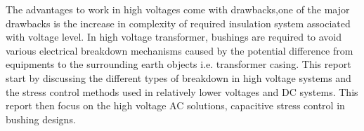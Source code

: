 The advantages to work in high voltages come with drawbacks,one of the major drawbacks is the increase in complexity of required insulation system associated with voltage level. In high voltage transformer, bushings are required to avoid various electrical breakdown mechanisms caused by the potential difference from equipments to the surrounding earth objects i.e. transformer casing. This report start by discussing the different types of breakdown in high voltage systems and the stress control methods used in relatively lower voltages and DC systems. This report then focus on the high voltage AC solutions, capacitive stress control in bushing designs.